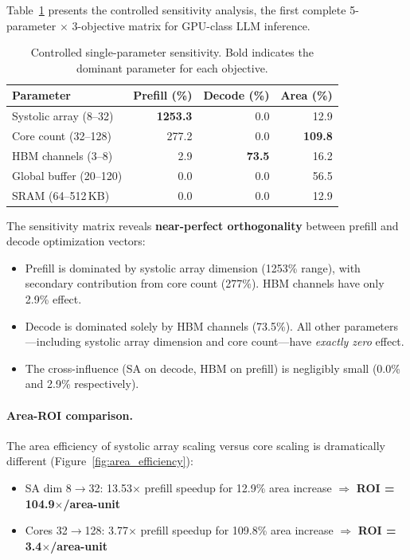 \documentclass[sigconf,10pt]{acmart}
\begin{document}
Table~\ref{tab:sensitivity} presents the controlled sensitivity analysis,
the first complete 5-parameter $\times$ 3-objective matrix for GPU-class
LLM inference.

\begin{table}[t]
\centering
\caption{Controlled single-parameter sensitivity. Bold indicates the
dominant parameter for each objective.}
\label{tab:sensitivity}
\begin{tabular}{lrrr}
\toprule
\textbf{Parameter} & \textbf{Prefill (\%)} & \textbf{Decode (\%)} & \textbf{Area (\%)} \\
\midrule
Systolic array (8--32) & \textbf{1253.3} & 0.0 & 12.9 \\
Core count (32--128)   & 277.2 & 0.0 & \textbf{109.8} \\
HBM channels (3--8)    & 2.9 & \textbf{73.5} & 16.2 \\
Global buffer (20--120) & 0.0 & 0.0 & 56.5 \\
SRAM (64--512\,KB)     & 0.0 & 0.0 & 12.9 \\
\bottomrule
\end{tabular}
\end{table}

The sensitivity matrix reveals \textbf{near-perfect orthogonality}
between prefill and decode optimization vectors:
\begin{itemize}
\item Prefill is dominated by systolic array dimension (1253\% range),
with secondary contribution from core count (277\%). HBM channels have
only 2.9\% effect.
\item Decode is dominated solely by HBM channels (73.5\%). All other
parameters---including systolic array dimension and core count---have
\emph{exactly zero} effect.
\item The cross-influence (SA on decode, HBM on prefill) is negligibly
small (0.0\% and 2.9\% respectively).
\end{itemize}

\paragraph{Area-ROI comparison.}
The area efficiency of systolic array scaling versus core scaling is
dramatically different (Figure~\ref{fig:area_efficiency}):

\begin{itemize}
\item SA dim 8$\to$32: 13.53$\times$ prefill speedup for 12.9\% area
increase $\Rightarrow$ \textbf{ROI = 104.9$\times$/area-unit}
\item Cores 32$\to$128: 3.77$\times$ prefill speedup for 109.8\% area
increase $\Rightarrow$ \textbf{ROI = 3.4$\times$/area-unit}
\end{itemize}
\end{document}
